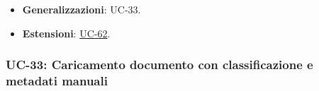 ﻿\documentclass[a4paper,12pt]{article}
\begin{document}
\begin{description}[style=multiline, leftmargin=4cm, font=\bfseries]
    \item[Relazioni]
    \begin{itemize}[leftmargin=*, nosep]
        \item \textbf{Generalizzazioni}: UC-33.
        \item \textbf{Estensioni}: \hyperref[errore-uc-62]{UC-62}.
    \end{itemize}

\end{description}

\subsubsection{UC-33: Caricamento documento con classificazione e metadati manuali}
\mbox{} \\
\end{document}
